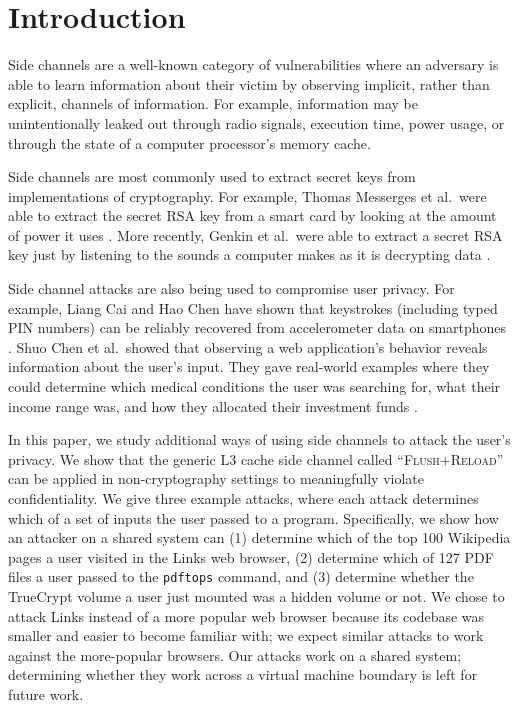 \documentclass[letterpaper,twocolumn,10pt]{article}
\begin{document}
\section{Introduction}
\label{sec:intro}

Side channels are a well-known category of vulnerabilities where an adversary is
able to learn information about their victim by observing implicit, rather than
explicit, channels of information. For example, information may be
unintentionally leaked out through radio signals, execution time, power usage,
or through the state of a computer processor's memory cache.

Side channels are most commonly used to extract secret keys from implementations
of cryptography. For example, Thomas Messerges et al.\ were able to extract the
secret RSA key from a smart card by looking at the amount of power it uses
\cite{messerges1999power}. More recently, Genkin et al.\ were able to extract
a secret RSA key just by listening to the sounds a computer makes as it is
decrypting data \cite{genkin2013rsa}. 

Side channel attacks are also being used to compromise user privacy. For
example, Liang Cai and Hao Chen have shown that keystrokes (including typed PIN
numbers) can be reliably recovered from accelerometer data on smartphones
\cite{cai2012practicality}. Shuo Chen et al.\ showed that observing a web
application's behavior reveals information about the user's input. They gave
real-world examples where they could determine which medical conditions the user
was searching for, what their income range was, and how they allocated their
investment funds \cite{chen2010side}.

In this paper, we study additional ways of using side channels to attack the
user's privacy. We show that the generic L3 cache side channel called
``\textsc{Flush+Reload}'' \cite{yarom2013flush} can be applied in
non-cryptography settings to meaningfully violate confidentiality. We give three
example attacks, where each attack determines which of a set of inputs the user
passed to a program. Specifically, we show how an attacker on a shared system
can (1) determine which of the top 100 Wikipedia pages a user visited in the
Links web browser, (2) determine which of 127 PDF files a user passed to the
\texttt{pdftops} command, and (3) determine whether the TrueCrypt volume a user
just mounted was a hidden volume or not. We chose to attack Links instead of
a more popular web browser because its codebase was smaller and easier to become
familiar with; we expect similar attacks to work against the more-popular
browsers. Our attacks work on a shared system; determining whether they work
across a virtual machine boundary is left for future work.
\end{document}
